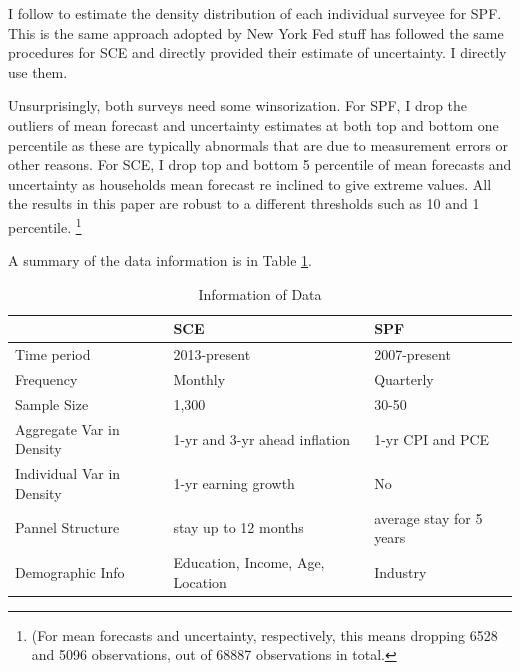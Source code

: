 \documentclass[]{article}
\begin{document}
	I follow \citet{engelberg2009comparing} to estimate the density distribution of each individual surveyee for SPF. This is the same approach adopted by New York Fed stuff \citet{armantier2017overview} has followed the same procedures for SCE and directly provided their estimate of uncertainty. I directly use them. 
	
	Unsurprisingly, both surveys need some  winsorization. For SPF, I drop the outliers of mean forecast and uncertainty estimates at both top and bottom one percentile as these are typically abnormals that are due to measurement errors or other reasons.   For SCE, I drop top and bottom 5 percentile of mean forecasts and uncertainty as households mean forecast re inclined to give extreme values. All the results in this paper are robust to a different thresholds such as 10 and 1 percentile. \footnote{(For mean forecasts and uncertainty, respectively, this means dropping 6528 and 5096 observations, out of 68887 observations in total.}
	
	A summary of the data information is in Table \ref{DataInfo}. 
	
	\begin{table}[ht]
		\caption{Information of Data}
		\label{DataInfo}
		\begin{tabular}{lll} 
			
			\hline 
			& SCE & SPF        \\
			\hline 
			Time period                                    & 2013-present                            & 2007-present             \\
			Frequency                                      & Monthly                                 & Quarterly                \\
			Sample Size                                    & 1,300                                   & 30-50                    \\
			Aggregate Var in Density                       & 1-yr  and 3-yr ahead inflation          & 1-yr CPI and PCE         \\
			Individual Var in Density                      & 1-yr earning growth                     & No                       \\
			Pannel Structure                               & stay up to 12 months                    & average stay for 5 years \\
			Demographic Info                        & Education, Income, Age, Location        & Industry    \\
			\hline 
		\end{tabular}
	\end{table}
	
\end{document}
